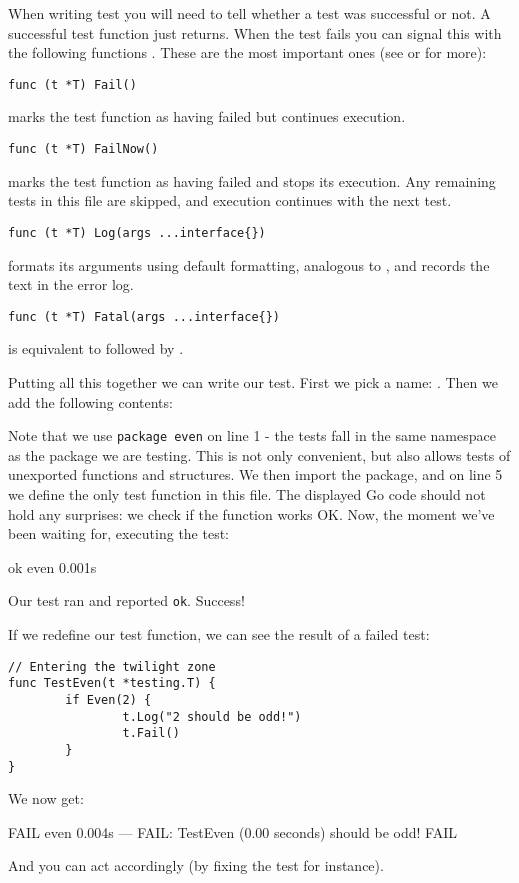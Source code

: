When writing test you will need to tell  whether a test was
successful or not. A successful test function just returns. When
the test fails you can signal this with the following
functions \cite{go_doc}. These are the most important ones (see  or  for more):

\begin{lstlisting}[numbers=none]
func (t *T) Fail()
\end{lstlisting}
 marks the test function as having failed but continues execution.

\begin{lstlisting}[numbers=none]
func (t *T) FailNow()
\end{lstlisting}
 marks the test function as having failed and stops its execution.
Any remaining tests in this file are skipped, and execution continues with the next test.

\begin{lstlisting}[numbers=none]
func (t *T) Log(args ...interface{})
\end{lstlisting}
 formats its arguments using default formatting, analogous to
, and records the text in the error log.

\begin{lstlisting}[numbers=none]
func (t *T) Fatal(args ...interface{})
\end{lstlisting}
 is equivalent to  followed by .

Putting all this together we can write our test. First
we pick a name: . Then we add the following contents:

Note that we use \lstinline{package even} on line 1 - the tests fall in the same
namespace as the package we are testing. This is not only convenient, but
also allows tests of unexported functions and structures. We then import
the  package, and on line 5 we define the only test
function in this file. The displayed Go code should not hold any
surprises: we check if the  function works OK. 
Now, the moment we've been waiting for, executing the test:
\begin{display}
\pr {}
ok      even    0.001s
\end{display}
\noindent{}Our test ran and reported \texttt{ok}. Success! 

If we redefine our test function, we can see the result of a failed test:
\begin{lstlisting}
// Entering the twilight zone
func TestEven(t *testing.T) {
        if Even(2) {
                t.Log("2 should be odd!")
                t.Fail()
        }   
}
\end{lstlisting}
We now get:
\begin{display}
FAIL    even    0.004s
--- FAIL: TestEven (0.00 seconds)
\qquad{} should be odd!
FAIL
\end{display}
\noindent{}And you can act accordingly (by fixing the test for instance).

